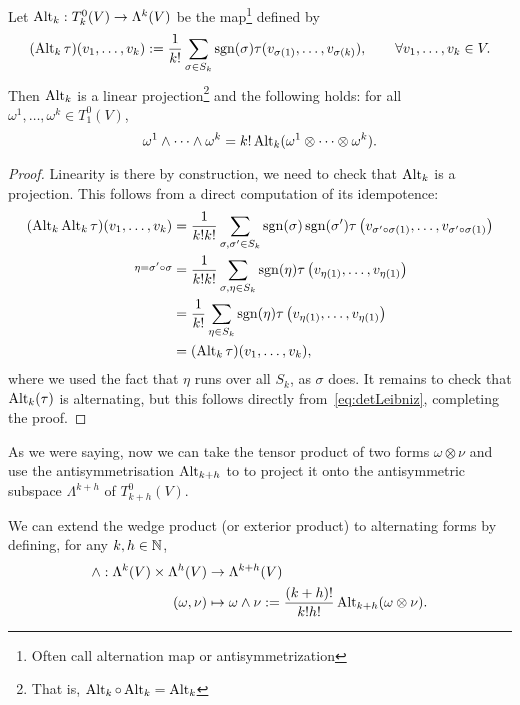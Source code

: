 \begin{proposition}
	Let $\operatorname{Alt}_k: T_k^0(V)\to \Lambda^k(V)$ be the map\footnote{Often call alternation map or antisymmetrization} defined by
	\begin{equation}
		(\operatorname{Alt}_k\tau)(v_1,\ldots,v_k) := \frac1{k!} \sum_{\sigma\in S_k} \operatorname{sgn}(\sigma) \tau(v_{\sigma(1)}, \ldots, v_{\sigma(k)}),
		\qquad \forall v_1,\ldots,v_k \in V.
	\end{equation}
	Then $\operatorname{Alt}_k$ is a linear projection\footnote{That is, $\operatorname{Alt}_k\circ\operatorname{Alt}_k = \operatorname{Alt}_k$} and the following holds:
	for all $\omega^1, \ldots, \omega^k \in T^0_1(V)$,
	\begin{equation}
		\omega^1 \wedge \cdots \wedge \omega^k = k! \operatorname{Alt}_k(\omega^1 \otimes \cdots \otimes \omega^k).
	\end{equation}
\end{proposition}
\begin{proof}
	Linearity is there by construction, we need to check that $\operatorname{Alt}_k$ is a projection.
	This follows from a direct computation of its idempotence:
	\begin{align}
		(\operatorname{Alt}_k \operatorname{Alt}_k \tau)(v_1,\ldots, v_k)
		 & = \frac1{k!k!}\sum_{\sigma,\sigma'\in S_k}\operatorname{sgn}(\sigma)\operatorname{sgn}(\sigma') \tau\left(v_{\sigma'\circ\sigma(1)}, \ldots, v_{\sigma'\circ\sigma(1)}\right) \\
		\overset{\eta = \sigma'\circ\sigma}{}
		 & =\frac1{k!k!}\sum_{\sigma,\eta\in S_k}\operatorname{sgn}(\eta) \tau\left(v_{\eta(1)}, \ldots, v_{\eta(1)}\right)                                                \\
		 & =\frac1{k!}\sum_{\eta\in S_k}\operatorname{sgn}(\eta) \tau\left(v_{\eta(1)}, \ldots, v_{\eta(1)}\right)                                                         \\
		 & =(\operatorname{Alt}_k \tau)(v_1,\ldots, v_k),
	\end{align}
	where we used the fact that $\eta$ runs over all $S_k$, as $\sigma$ does.
	It remains to check that $\operatorname{Alt}_k(\tau)$ is alternating, but this follows directly from~\eqref{eq:detLeibniz}, completing the proof.
\end{proof}

As we were saying, now we can take the tensor product of two forms $\omega\otimes\nu$ and use the antisymmetrisation $\operatorname{Alt}_{k+h}$ to to project it onto the antisymmetric subspace $\Lambda^{k+h}$ of $T_{k+h}^0(V)$.

\begin{definition}
	We can extend the wedge product (or exterior product) to alternating forms by defining, for any $k,h\in\mathbb{N}$,
	\begin{align}
		\wedge : \Lambda^k(V)\times\Lambda^h(V) & \to \Lambda^{k+h}(V)                                                         \\
		(\omega, \nu)                           & \mapsto \omega\wedge\nu := \frac{(k+h)!}{k!h!} \operatorname{Alt}_{k+h}(\omega\otimes\nu).
	\end{align}
\end{definition}

